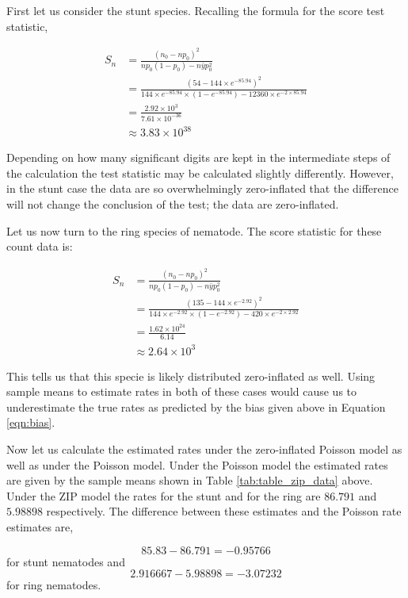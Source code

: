 \documentclass{article}
\begin{document}
First let us consider the stunt species. Recalling the formula for the score test statistic,

\begin{eqnarray}
S_n &= \frac{(n_0 - np_0)^2}{np_0(1-p_0) - n\bar{y}p_0^2}\\
&= \frac{(54 - 144\times e^{-85.94})^2 }{144\times e^{-85.94}\times (1-e^{-85.94}) - 12360\times e^{-2\times85.94} }\\
&= \frac{2.92\times10^{3}}{7.61\times10^{-36}}\\
&\approx3.83\times10^{38}
\end{eqnarray}

Depending on how many significant digits are kept in the intermediate steps of the calculation the test statistic may be calculated slightly differently. However, in the stunt case the data are so overwhelmingly zero-inflated that the difference will not change the conclusion of the test; the data are zero-inflated. 

Let us now turn to the ring species of nematode. The score statistic for these count data is:

\begin{eqnarray}
S_n &= \frac{(n_0 - np_0)^2}{np_0(1-p_0) - n\bar{y}p_0^2}\\
&= \frac{(135 - 144\times e^{-2.92})^2 }{144\times e^{-2.92}\times (1-e^{-2.92}) - 420\times e^{-2\times2.92} }\\
&= \frac{1.62\times10^{24}}{6.14}\\
&\approx2.64\times10^{3}
\end{eqnarray}

This tells us that this specie is likely distributed zero-inflated as well. Using sample means to estimate rates in both of these cases would cause us to underestimate the true rates as predicted by the bias given above in Equation \ref{eqn:bias}. 

Now let us calculate the estimated rates under the zero-inflated Poisson model as well as under the Poisson model. Under the Poisson model the estimated rates are given by the sample means shown in Table \ref{tab:table_zip_data} above. Under the ZIP model the rates for the stunt and for the ring are $86.791$ and $5.98898$ respectively. The difference between these estimates and the Poisson rate estimates are, 

\begin{equation}
85.83 - 86.791=-0.95766
\end{equation}
for stunt nematodes and 
\begin{equation}
2.916667-5.98898=-3.07232
\end{equation}
for ring nematodes. 
\end{document}
